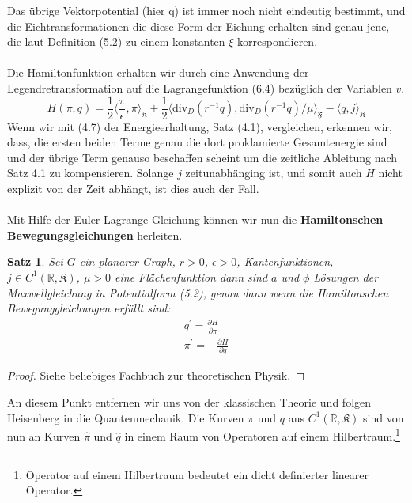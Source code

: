 \documentclass[11pt,a4paper,leqno]{report}
\newtheorem{proposition}{Satz}[chapter]
\numberwithin{equation}{chapter}
\begin{document}
\noindent
Das \"ubrige Vektorpotential (hier q) ist immer noch nicht eindeutig bestimmt, und die Eichtransformationen die diese Form der Eichung erhalten sind genau jene, die laut Definition (5.2) zu einem konstanten $\xi$ korrespondieren.\\
\\
Die Hamiltonfunktion erhalten wir durch eine Anwendung der Legendretransformation auf die Lagrangefunktion (6.4) bez\"uglich der Variablen $v$.
\begin{equation}
	H(\pi, q) = \frac{1}{2}\langle \frac{\pi}{\epsilon}, \pi\rangle_{\mathfrak{K}} + \frac{1}{2}\langle \text{div}_D(r^{-1}q), \text{div}_D(r^{-1}q)/\mu\rangle_{\mathfrak{F}} - \langle q, j\rangle_{\mathfrak{K}}
\end{equation}
Wenn wir mit (4.7) der Energieerhaltung, Satz (4.1), vergleichen, erkennen wir, dass, die ersten beiden Terme genau die dort proklamierte Gesamtenergie sind und der \"ubrige Term genauso beschaffen scheint um die zeitliche Ableitung nach Satz 4.1 zu kompensieren. Solange $j$ zeitunabh\"anging ist, und somit auch $H$ nicht explizit von der Zeit abh\"angt, ist dies auch der Fall.\\
\\
Mit Hilfe der Euler-Lagrange-Gleichung k\"onnen wir nun die \textbf{Hamiltonschen Bewegungsgleichungen} herleiten.
\begin{proposition}
Sei $G$ ein planarer Graph, $r>0$, $\epsilon>0$,  Kantenfunktionen, $j\in C^1(\mathbb{R}, \mathfrak{K})$, $\mu>0$ eine Fl\"achenfunktion dann sind $a$ und $\phi$ L\"osungen der Maxwellgleichung in Potentialform (5.2), genau dann wenn die Hamiltonschen Bewegunggleichungen erf\"ullt sind:
\begin{align}
	q^\prime = \frac{\partial H}{\partial \pi}\\
	\pi^\prime = - \frac{\partial H}{\partial q}
\end{align}
\end{proposition}
\begin{proof}
	Siehe beliebiges Fachbuch zur theoretischen Physik.
\end{proof}
\noindent
An diesem Punkt entfernen wir uns von der klassischen Theorie und folgen Heisenberg in die Quantenmechanik. Die Kurven $\pi$ und $q$ aus $C^1(\mathbb{R}, \mathfrak{K})$ sind von nun an Kurven $\hat{\pi}$ und $\hat{q}$ in einem Raum von Operatoren auf einem Hilbertraum.\footnote{Operator auf einem Hilbertraum bedeutet ein dicht definierter linearer Operator.}
\end{document}
